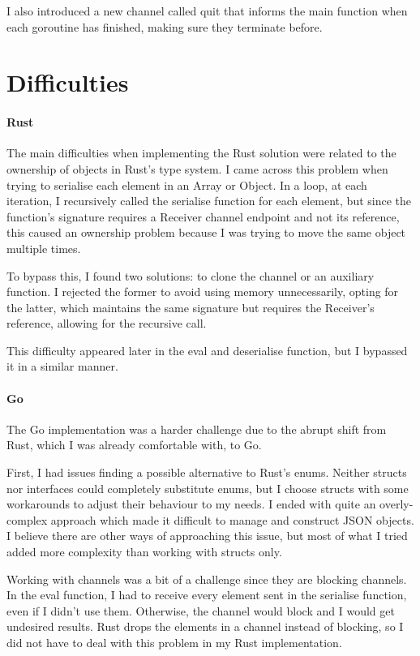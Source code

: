 \documentclass[a4paper]{article}
\begin{document}
I also introduced a new channel called quit that informs the main function when each goroutine has finished, making sure they terminate before.

\section*{Difficulties}
\paragraph*{Rust}  
The main difficulties when implementing the Rust solution were related to the ownership of objects in Rust's type system. I came across this problem when trying to serialise each element in an Array or Object. In a loop, at each iteration, I recursively called the serialise function for each element, but since the function's signature requires a Receiver channel endpoint and not its reference, this caused an ownership problem because I was trying to move the same object multiple times.

To bypass this, I found two solutions: to clone the channel or an auxiliary function. I rejected the former to avoid using memory unnecessarily, opting for the latter, which maintains the same signature but requires the Receiver's reference, allowing for the recursive call.

This difficulty appeared later in the eval and deserialise function, but I bypassed it in a similar manner.
\paragraph*{Go}
The Go implementation was a harder challenge due to the abrupt shift from Rust, which I was already comfortable with, to Go.

First, I had issues finding a possible alternative to Rust's enums. Neither structs nor interfaces could completely substitute enums, but I choose structs with some workarounds to adjust their behaviour to my needs. I ended with quite an overly-complex approach which made it difficult to manage and construct JSON objects.
I believe there are other ways of approaching this issue, but most of what I tried added more complexity than working with structs only.

Working with channels was a bit of a challenge since they are blocking channels. In the eval function, I had to receive every element sent in the serialise function, even if I didn't use them. Otherwise, the channel would block and I would get undesired results. Rust drops the elements in a channel instead of blocking, so I did not have to deal with this problem in my Rust implementation.
\end{document}
